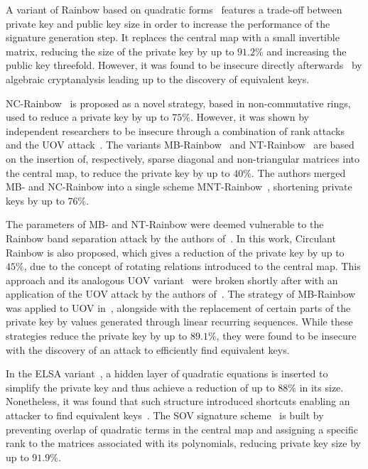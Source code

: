 \documentclass[draft, 12pt, a4paper, oneside]{memoir}
\theoremstyle{definition}
\begin{document}
A variant of Rainbow based on quadratic forms~\cite{Yasuda:201306} features a trade-off between private key and public key size in order to increase the performance of the signature generation step. It replaces the central map with a small invertible matrix, reducing the size of the private key by up to $91.2\%$ and increasing the public key threefold. However, it was found to be insecure directly afterwards~\cite{Hashimoto:201410} by algebraic cryptanalysis leading up to the discovery of equivalent keys.

NC-Rainbow~\cite{Yasuda:201202} is proposed as a novel strategy, based in non-commutative rings, used to reduce a private key by up to $75\%$. However, it was shown by independent researchers to be insecure through a combination of rank attacks and the UOV attack~\cite{Thomae:201209,Hashimoto:201302}. The variants MB-Rainbow~\cite{Yasuda:201305} and NT-Rainbow~\cite{Yasuda:201404} are based on the insertion of, respectively, sparse diagonal and non-triangular matrices into the central map, to reduce the private key by up to $40\%$. The authors merged MB- and NC-Rainbow into a single scheme MNT-Rainbow~\cite{Yasuda:201409}, shortening private keys by up to $76\%$. 

The parameters of MB- and NT-Rainbow were deemed vulnerable to the Rainbow band separation attack by the authors of~\cite{Peng:201706}. In this work, Circulant Rainbow is also proposed, which gives a reduction of the private key by up to $45\%$, due to the concept of rotating relations introduced to the central map. This approach and its analogous UOV variant~\cite{Peng:201803} were broken shortly after with an application of the UOV attack by the authors of~\cite{Hashimoto:201903}. The strategy of MB-Rainbow was applied to UOV in~\cite{Tan:201511}, alongside with the replacement of certain parts of the private key by values generated through linear recurring sequences. While these strategies reduce the private key by up to $89.1\%$, they were found to be insecure~\cite{Park:201803} with the discovery of an attack to efficiently find equivalent keys. 

In the ELSA variant~\cite{Shim:201712}, a hidden layer of quadratic equations is inserted to simplify the private key and thus achieve a reduction of up to $88\%$ in its size. Nonetheless, it was found that such structure introduced shortcuts enabling an attacker to find equivalent keys~\cite{Hashimoto:201909}. The SOV signature scheme~\cite{Shim:202001} is built by preventing overlap of quadratic terms in the central map and assigning a specific rank to the matrices associated with its polynomials, reducing private key size by up to $91.9\%$.
\end{document}
